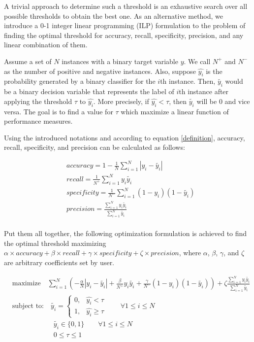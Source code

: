 \documentclass[a4paper]{article}
\begin{document}
A trivial approach to determine such a threshold is an exhaustive search over all possible thresholds to obtain the best one. As an alternative method, we introduce a 0-1 integer linear programming (ILP) formulation to the problem of finding the optimal threshold for accuracy, recall, specificity, precision, and any linear combination of them.

Assume a set of $N$ instances with a binary target variable $y$. We call $N^+$ and $N^-$ as the number of positive and negative instances. Also, suppose $\hat{y_i}$ is the probability generated by a binary classifier for the $i$th instance. Then, $\tilde{y_i}$ would be a binary decision variable that represents the label of $i$th instance after applying the threshold $\tau$ to $\hat{y_i}$. More precisely, if $\hat{y_i} < \tau$, then $\tilde{y_i}$ will be $0$ and vice versa. The goal is to find a value for $\tau$ which maximize a linear function of performance measures.

Using the introduced notations and according to equation \ref{definition}, accuracy, recall, specificity, and precision can be calculated as follows:

\begin{equation}
\begin{aligned}
&accuracy = 1 - \frac{1}{N} \sum_{i=1}^{N} |y_i - \tilde{y_i}|\\
&recall = \frac{1}{N^+} \sum_{i=1}^{N} y_i \tilde{y_i}\\
&specificity = \frac{1}{N^-} \sum_{i=1}^{N} (1-y_i) (1-\tilde{y_i})\\
&precision = \frac{\sum_{i=1}^{N} y_i \tilde{y_i}}{\sum_{i=1}^{N} \tilde{y_i}}\\
\end{aligned}
\end{equation}

Put them all together, the following optimization formulation is achieved to find the optimal threshold maximizing $\alpha \times \textit{accuracy} + \beta \times \textit{recall} + \gamma \times \textit{specificity} + \zeta \times precision$, where $\alpha$, $\beta$, $\gamma$, and $\zeta$ are arbitrary coefficients set by user.

\begin{equation}
\label{optimization_formulation}
\begin{aligned}
	&\text{maximize} \quad \sum_{i=1}^{N} \left(-\frac{\alpha}{N}|y_i -\tilde{y_i}| + \frac{\beta}{N^+} y_i \tilde{y_i} + \frac{\gamma}{N^-} (1-y_i) (1-\tilde{y_i})\right) + \zeta \frac{\sum_{i=1}^{N} y_i \tilde{y_i}}{\sum_{i=1}^{N} \tilde{y_i}}\\
	&\text{subject to:} \quad \tilde{y_i} = 
	\begin{cases}
	0, & \hat{y_i} < \tau \\
	1, & \hat{y_i} \ge \tau
	\end{cases} \qquad \forall 1\le i \le N\\
	& \qquad \qquad \qquad \tilde{y_i} \in \{0, 1\} \qquad \forall 1\le i \le N\\
	& \qquad \qquad \qquad 0 \le \tau \le 1 \qquad
\end{aligned}
\end{equation}
\end{document}
